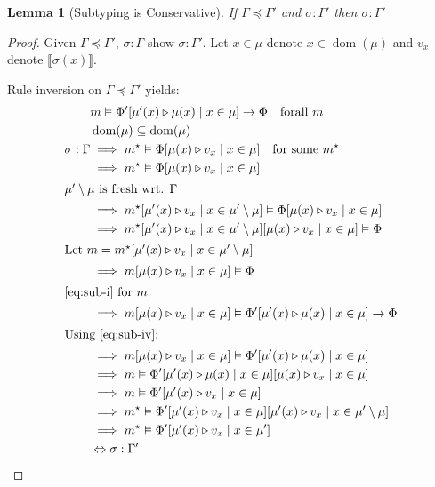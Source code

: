 \documentclass[twoside, english]{sdqthesis}
\newcommand{\bbracket}[1]{\llbracket #1 \rrbracket}
\newcommand{\tr}[0]{\triangleright}
\DeclareMathOperator{\dom}{dom}
\newtheorem{lemma}[theorem]{Lemma}
\theoremstyle{definition}
\begin{document}
\begin{lemma}[Subtyping is Conservative]\label{lem:conservative-subtype}
  If $\Gamma \preceq \Gamma'$ and $\sigma : \Gamma'$ then $\sigma : \Gamma'$
\end{lemma}

\begin{proof}
  Given $\Gamma \preceq \Gamma'$, $\sigma : \Gamma$ show $\sigma : \Gamma'$. Let $x \in \mu$ denote $x \in \dom(\mu)$ and $v_x$ denote $\bbracket{\sigma(x)}$.

  Rule inversion on $\Gamma \preceq \Gamma'$ yields:
  \begin{align}
      &m \vDash \Phi'[\mu'(x) \tr \mu(x) \mid x \in \mu] \to \Phi \quad \text{forall }m\label{eq:sub-i}
    \\ 
      & \dom(\mu) \subseteq \dom(\mu)\label{eq:sub-ii}
    \\ 
      \sigma : \Gamma 
      &\implies m^\star \vDash \Phi[\mu(x) \tr v_x \mid x \in \mu] \quad \text{for some }m^\star
    \\
      &\implies m^\star \vDash \Phi[\mu(x) \tr v_x \mid x \in \mu]
    \\ 
      \intertext{$\mu' \setminus \mu$  is fresh wrt. $\Gamma$}
      &\implies m^\star[\mu'(x) \tr v_x \mid x\in\mu'\setminus\mu] 
      \vDash \Phi[\mu(x) \tr v_x \mid x \in \mu] 
    \\
      &\implies  m^\star[\mu'(x) \tr v_x \mid x\in\mu'\setminus\mu][\mu(x) \tr v_x \mid x \in \mu] 
      \vDash \Phi
    \\
      \intertext{Let $m=m^\star[\mu'(x) \tr v_x \mid x \in \mu'\setminus\mu]$}
      &\implies  m[\mu(x) \tr v_x \mid x \in \mu] 
      \vDash \Phi\label{eq:sub-iv}
    \\
      \intertext{\cref{eq:sub-i} for $m$}
      &\implies m[\mu(x) \tr v_x \mid x \in \mu] 
      \vDash \Phi'[\mu'(x) \tr \mu(x) \mid x \in \mu] \to \Phi
    \\
      \intertext{Using \cref{eq:sub-iv}:}
      &\implies m[\mu(x) \tr v_x \mid x \in \mu] 
      \vDash \Phi'[\mu'(x) \tr \mu(x) \mid x \in \mu]
    \\
      &\implies m 
      \vDash \Phi'[\mu'(x) \tr \mu(x) \mid x \in \mu][\mu(x) \tr v_x \mid x \in \mu]
    \\
      &\implies m
      \vDash \Phi'[\mu'(x) \tr v_x \mid x \in \mu]
    \\
      &\implies m^\star
      \vDash \Phi'[\mu'(x) \tr v_x \mid x \in \mu][\mu'(x) \tr v_x \mid x \in \mu'\setminus\mu]
    \\
      &\implies m^\star
      \vDash \Phi'[\mu'(x) \tr v_x \mid x \in \mu']
    \\
      &\Leftrightarrow \sigma : \Gamma'
  \end{align}
\end{proof}
\end{document}
